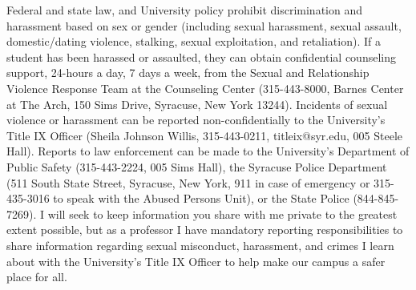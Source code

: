 \documentclass[12pt]{article}
\begin{document}
Federal and state law, and University policy prohibit discrimination and harassment based on sex or gender (including sexual harassment, sexual assault, domestic/dating violence, stalking, sexual exploitation, and retaliation). If a student has been harassed or assaulted, they can obtain confidential counseling support, 24-hours a day, 7 days a week, from the Sexual and Relationship Violence Response Team at the Counseling Center (315-443-8000, Barnes Center at The Arch, 150 Sims Drive, Syracuse, New York 13244). Incidents of sexual violence or harassment can be reported non-confidentially to the University’s Title IX Officer (Sheila Johnson Willis, 315-443-0211, titleix@syr.edu, 005 Steele Hall). Reports to law enforcement can be made to the University’s Department of Public Safety (315-443-2224, 005 Sims Hall), the Syracuse Police Department (511 South State Street, Syracuse, New York, 911 in case of emergency or 315-435-3016 to speak with the Abused Persons Unit), or the State Police (844-845-7269). I will seek to keep information you share with me private to the greatest extent possible, but as a professor I have mandatory reporting responsibilities to share information regarding sexual misconduct, harassment, and crimes I learn about with the University’s Title IX Officer to help make our campus a safer place for all.
\end{document}
